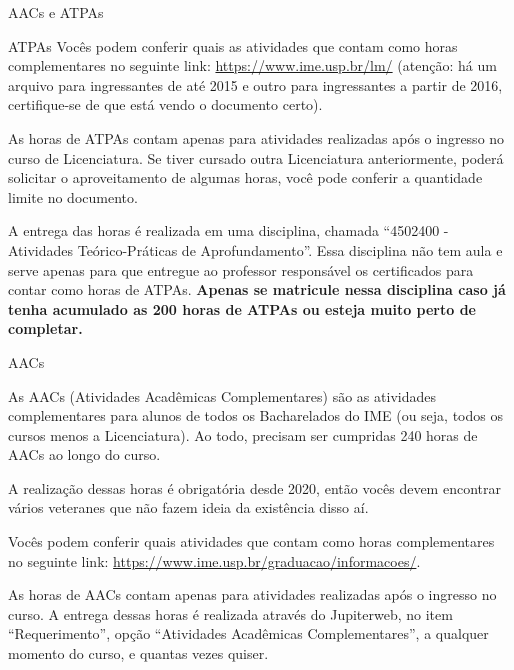 \begin{secao}{AACs e ATPAs}
\begin{subsecao}{ATPAs}
Vocês podem conferir quais as atividades que contam como horas complementares
no seguinte link: \url{https://www.ime.usp.br/lm/} (atenção: há um arquivo para
ingressantes de até 2015 e outro para ingressantes a partir de 2016,
certifique-se de que está vendo o documento certo).

As horas de ATPAs contam apenas para atividades realizadas após o ingresso no
curso de Licenciatura. Se tiver cursado outra Licenciatura anteriormente, poderá
solicitar o aproveitamento de algumas horas, você pode conferir a quantidade
limite no documento.

A entrega das horas é realizada em uma disciplina, chamada
``4502400 - Atividades Teórico-Práticas de Aprofundamento''. Essa disciplina não
tem aula e serve apenas para que entregue ao professor responsável os certificados
para contar como horas de ATPAs. \bf{Apenas se matricule nessa disciplina caso já}
\bf{tenha acumulado as 200 horas de ATPAs ou esteja muito perto de completar.}

\end{subsecao}

\begin{subsecao}{AACs}

As AACs (Atividades Acadêmicas Complementares) são as atividades complementares
para alunos de todos os Bacharelados do IME (ou seja, todos os cursos menos a
Licenciatura). Ao todo, precisam ser cumpridas 240 horas de AACs ao longo do curso.

A realização dessas horas é obrigatória desde 2020, então vocês devem encontrar
vários veteranes que não fazem ideia da existência disso aí.

Vocês podem conferir quais atividades que contam como horas complementares
no seguinte link: \url{https://www.ime.usp.br/graduacao/informacoes/}.

As horas de AACs contam apenas para atividades realizadas após o ingresso no curso.
A entrega dessas horas é realizada através do Jupiterweb, no item ``Requerimento'',
opção ``Atividades Acadêmicas Complementares'', a qualquer momento do curso, e
quantas vezes quiser.

\end{subsecao}

\end{secao}
